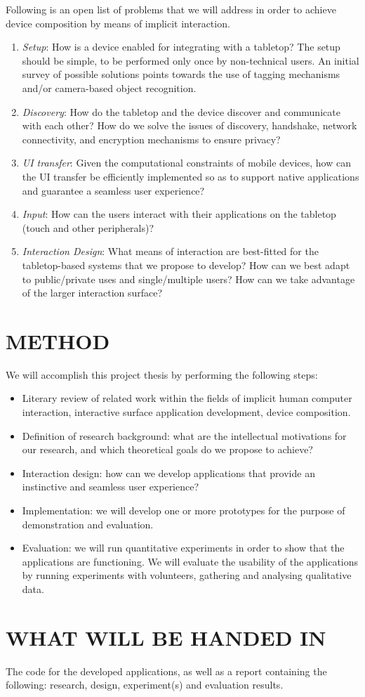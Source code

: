 Following is an open list of problems that we will address in order to achieve device composition by means of implicit interaction.
\begin{enumerate}
\item{\emph{Setup}: How is a device enabled for integrating with a tabletop?
The setup should be simple, to be performed only once by non-technical users.
An initial survey of possible solutions points towards the use of tagging mechanisms and/or camera-based object recognition.}
\item{\emph{Discovery}: How do the tabletop and the device discover and communicate with each other?
How do we solve the issues of discovery, handshake, network connectivity, and encryption mechanisms to ensure privacy?}
\item{\emph{UI transfer}: Given the computational constraints of mobile devices, how can the UI transfer be efficiently implemented so as to support native applications and guarantee a seamless user experience?}
\item{\emph{Input}: How can the users interact with their applications on the tabletop (touch and other peripherals)?}
\item{\emph{Interaction Design}: What means of interaction are best-fitted for the tabletop-based systems that we propose to develop?
How can we best adapt to public/private uses and single/multiple users?
How can we take advantage of the larger interaction surface?}
\end{enumerate}

\section{METHOD}

We will accomplish this project thesis by performing the following steps:
\begin{itemize}
\item{Literary review of related work within the fields of implicit human computer interaction, interactive surface application development, device composition.}
\item{Definition of research background: what are the intellectual motivations for our research, and which theoretical goals do we propose to achieve?}
\item{Interaction design: how can we develop applications that provide an instinctive and seamless user experience?}
\item{Implementation: we will develop one or more prototypes for the purpose of demonstration and evaluation.}
\item{Evaluation: we will run quantitative experiments in order to show that the applications are functioning. We will evaluate the usability of the applications by running experiments with volunteers, gathering and analysing qualitative data.}
\end{itemize}

\section{WHAT WILL BE HANDED IN}

The code for the developed applications, as well as a report containing the following: research, design, experiment(s) and evaluation results.